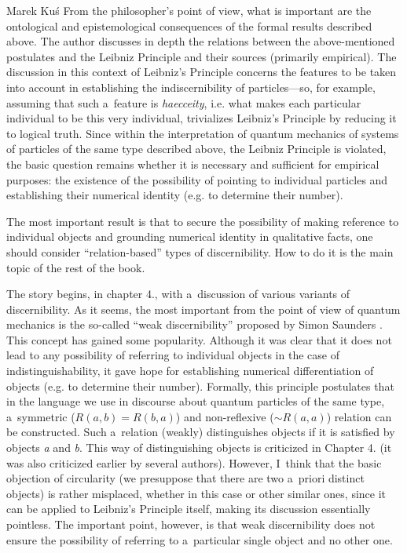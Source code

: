 \begin{newrevengenv}{Marek Kuś}
From the philosopher's point of view, what is important are the ontological and epistemological consequences of the formal results described above. The author discusses in depth the relations between the above-mentioned postulates and the Leibniz Principle and their sources (primarily empirical). The discussion in this context of Leibniz's Principle concerns the features to be taken into account in establishing the indiscernibility of particles—so, for example, assuming that such a~feature is \textit{haecceity}, i.e. what makes each particular individual to be this very individual, trivializes Leibniz's Principle by reducing it to logical truth. Since within the interpretation of quantum mechanics of systems of particles of the same type described above, the Leibniz Principle is violated, the basic question remains whether it is necessary and sufficient for empirical purposes: the existence of the possibility of pointing to individual particles and establishing their numerical identity (e.g. to determine their number).

The most important result is that to secure the possibility of making reference to individual objects and grounding numerical identity in qualitative facts, one should consider ``relation-based'' types of discernibility. How to do it is the main topic of the rest of the book.

The story begins, in chapter 4., with a~discussion of various variants of discernibility. As it seems, the most important from the point of view of quantum mechanics is the so-called ``weak discernibility'' proposed by Simon Saunders
\parencite*[][]{brading_physics_2003}. %
 This concept has gained some popularity. Although it was clear that it does not lead to any possibility of referring to individual objects in the case of indistinguishability, it gave hope for establishing numerical differentiation of objects (e.g. to determine their number). Formally, this principle postulates that in the language we use in discourse about quantum particles of the same type, a~symmetric ($R(a,b) = R(b,a)$) and non-reflexive (${\sim}R(a,a)$) relation can be constructed. Such a~relation (weakly) distinguishes objects if it is satisfied by objects \textit{a} and \textit{b}. This way of distinguishing objects is criticized in Chapter 4. (it was also criticized earlier by several authors). However, I~think that the basic objection of circularity (we presuppose that there are two a~priori distinct objects) is rather misplaced, whether in this case or other similar ones, since it can be applied to Leibniz's Principle itself, making its discussion essentially pointless. The important point, however, is that weak discernibility does not ensure the possibility of referring to a~particular single object and no other one.


\end{newrevengenv}
